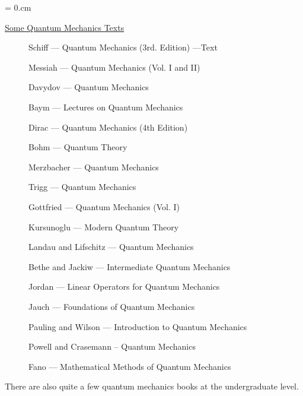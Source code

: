 


\baselineskip=14pt
\parindent = 0.cm
\setlength{\parskip}{\baselineskip}
\noindent

\twelverm

\baselineskip 16pt

\tableofcontents
%
\newpage

\underline{Some Quantum Mechanics Texts}

\begin{description}
\item[] Schiff  --- Quantum Mechanics (3rd. Edition) ---Text
\item[] Messiah --- Quantum Mechanics (Vol. I and II) 
\item[] Davydov --- Quantum Mechanics 
\item[] Baym    --- Lectures on Quantum Mechanics
\item[] Dirac   --- Quantum Mechanics (4th Edition)
\item[] Bohm    --- Quantum Theory
\item[] Merzbacher --- Quantum Mechanics
\item[] Trigg   --- Quantum Mechanics
\item[] Gottfried --- Quantum Mechanics (Vol. I)
\item[] Kursunoglu --- Modern Quantum Theory
\item[] Landau and Lifschitz --- Quantum Mechanics 
\item[] Bethe and Jackiw --- Intermediate Quantum Mechanics
\item[] Jordan --- Linear Operators for Quantum Mechanics
\item[] Jauch --- Foundations of Quantum Mechanics
\item[] Pauling and Wilson --- Introduction to Quantum Mechanics
\item[] Powell and Crasemann -- Quantum Mechanics
\item[] Fano --- Mathematical Methods of Quantum Mechanics
\end{description}

There are also quite a few quantum mechanics books at the undergraduate
level.

\newpage


     

